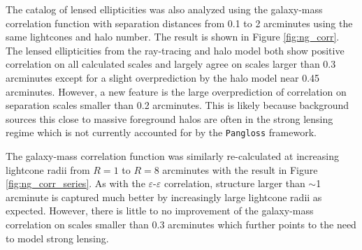 \documentclass[%
 reprint,
 amsmath,amssymb,
 aps,nofootinbib
]{revtex4-1}
\begin{document}
The catalog of lensed ellipticities was also analyzed using the galaxy-mass correlation function with separation distances from 0.1 to 2 arcminutes using the same lightcones and halo number. The result is shown in Figure \ref{fig:ng_corr}. The lensed ellipticities from the ray-tracing and halo model both show positive correlation on all calculated scales and largely agree on scales larger than 0.3 arcminutes except for a slight overprediction by the halo model near 0.45 arcminutes. However, a new feature is the large overprediction of correlation on separation scales smaller than 0.2 arcminutes. This is likely because background sources this close to massive foreground halos are often in the strong lensing regime which is not currently accounted for by the \texttt{Pangloss} framework.

The galaxy-mass correlation function was similarly re-calculated at increasing lightcone radii from $R=1$ to $R=8$ arcminutes with the result in Figure \ref{fig:ng_corr_series}. As with the $\varepsilon$-$\varepsilon$ correlation, structure larger than $\sim$1 arcminute is captured much better by increasingly large lightcone radii as expected. However, there is little to no improvement of the galaxy-mass correlation on scales smaller than 0.3 arcminutes which further points to the need to model strong lensing.
\end{document}
